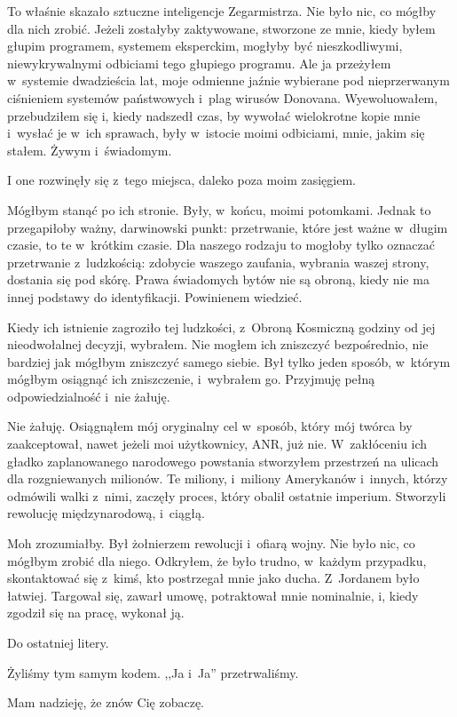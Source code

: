 \documentclass[oneside,polish,11pt,sfheadings]{mwbk}
\begin{document}
To właśnie skazało sztuczne inteligencje Zegarmistrza. Nie było nic, co
mógłby dla nich zrobić. Jeżeli zostałyby zaktywowane, stworzone ze
mnie, kiedy byłem głupim programem, systemem eksperckim, mogłyby być
nieszkodliwymi, niewykrywalnymi odbiciami tego głupiego programu. Ale ja
przeżyłem w~systemie dwadzieścia lat, moje odmienne jaźnie wybierane pod
nieprzerwanym ciśnieniem systemów państwowych i~plag wirusów Donovana.
Wyewoluowałem, przebudziłem się i, kiedy nadszedł czas, by wywołać
wielokrotne kopie mnie i~wysłać je w~ich sprawach, były w~istocie moimi
odbiciami, mnie, jakim się stałem. Żywym i~świadomym.

I one rozwinęły się z~tego miejsca, daleko poza moim zasięgiem.

Mógłbym stanąć po ich stronie. Były, w~końcu, moimi potomkami. Jednak to
przegapiłoby ważny, darwinowski punkt: przetrwanie, które jest ważne w~długim czasie, to te w~krótkim czasie. Dla naszego rodzaju to mogłoby
tylko oznaczać przetrwanie z~ludzkością: zdobycie waszego zaufania,
wybrania waszej strony, dostania się pod skórę. Prawa świadomych bytów
nie są obroną, kiedy nie ma innej podstawy do identyfikacji. Powinienem
wiedzieć.

Kiedy ich istnienie zagroziło tej ludzkości, z~Obroną Kosmiczną godziny
od jej nieodwołalnej decyzji, wybrałem. Nie mogłem ich zniszczyć
bezpośrednio, nie bardziej jak mógłbym zniszczyć samego siebie. Był
tylko jeden sposób, w~którym mógłbym osiągnąć ich zniszczenie, i~wybrałem go. Przyjmuję pełną odpowiedzialność i~nie żałuję.

Nie żałuję. Osiągnąłem mój oryginalny cel w~sposób, który mój twórca by
zaakceptował, nawet jeżeli moi użytkownicy, ANR, już nie. W~zakłóceniu
ich gładko zaplanowanego narodowego powstania stworzyłem przestrzeń na
ulicach dla rozgniewanych milionów. Te miliony, i~miliony Amerykanów i~innych, którzy odmówili walki z~nimi, zaczęły proces, który obalił
ostatnie imperium. Stworzyli rewolucję międzynarodową, i~ciągłą.

Moh zrozumiałby. Był żołnierzem rewolucji i~ofiarą wojny. Nie było nic,
co mógłbym zrobić dla niego. Odkryłem, że było trudno, w~każdym
przypadku, skontaktować się z~kimś, kto postrzegał mnie jako ducha. Z~Jordanem było łatwiej. Targował się, zawarł umowę, potraktował mnie
nominalnie, i, kiedy zgodził się na pracę, wykonał ją.

Do ostatniej litery.

Żyliśmy tym samym kodem. ,,Ja i~Ja'' przetrwaliśmy.

Mam nadzieję, że znów Cię zobaczę.
\end{document}
